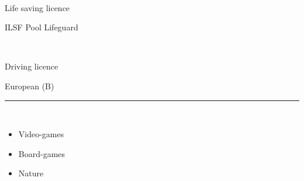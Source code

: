 \documentclass[a4paper,10pt]{article}
\newlength{\cvcolumngapwidth}
\newlength{\cvleftcolumnwidth}
\newlength{\cvrightcolumnwidth}
\newcommand{\cvsectionstyle}[1]{{\normalsize\cvsectionfont\textcolor{cvsectioncolor}{#1}}}
\newcommand{\cvheadingstyle}[1]{{\normalsize\cvheadingfont\textcolor{cvheadingcolor}{#1}}}
\newlength{\cvafteritemskipamount}
\newlength{\cvaftersectionskipamount}
\newlength{\cvbetweensectionandheadingextraskipamount}
\newlength{\cvparskip}
\newcommand{\cvsection}[1]{
    \begin{minipage}[t]{\cvleftcolumnwidth}
        \raggedleft\cvsectionstyle{#1}
    \end{minipage}%
    \hspace{\cvcolumngapwidth}%
    \begin{minipage}[t]{\cvrightcolumnwidth}
        \textcolor{cvrulecolor}{\rule{\cvrightcolumnwidth}{0.3mm}}
    \end{minipage}

    \vspace{\cvaftersectionskipamount}
}
\newcommand{\cvitem}[2]{
    \begin{minipage}[t]{\cvleftcolumnwidth}
        \raggedleft #1
    \end{minipage}%
    \hspace{\cvcolumngapwidth}%
    \begin{minipage}[t]{\cvrightcolumnwidth}
        \setlength{\parskip}{\cvparskip} #2
    \end{minipage}

    \vspace{\cvafteritemskipamount}
}
\begin{document}
\cvitem{
    \ 
}{
    \cvheadingstyle{Life saving licence} 
    
    ILSF Pool Lifeguard
}

\cvitem{
    \ 
}{
    \cvheadingstyle{Driving licence} 
    
    European (B)
}


\cvsection{INTERESTS}

\vspace{\cvbetweensectionandheadingextraskipamount}


\cvitem{
    \ 
}{
    \begin{itemize}[leftmargin=*]
    \item Video-games
    \item Board-games
    \item Nature
    \end{itemize}
    }
\end{document}
